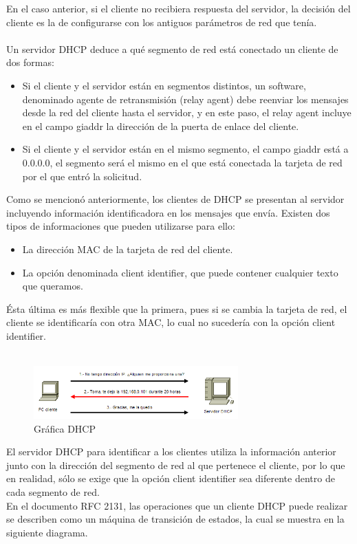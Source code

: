 		En el caso anterior, si el cliente no recibiera respuesta del servidor, la decisión del cliente es la de configurarse con los antiguos parámetros de red que tenía.\\\\
		Un servidor DHCP deduce a qué segmento de red está conectado un cliente de dos formas:
			\begin{itemize}
				\item Si el cliente y el servidor están en segmentos distintos, un software, denominado agente de retransmisión (relay agent) debe reenviar los mensajes desde la red del cliente hasta el servidor, y en este paso, el relay agent incluye en el campo giaddr la dirección de la puerta de enlace del cliente.
				\item Si el cliente y el servidor están en el mismo segmento, el campo giaddr está a 0.0.0.0, el segmento será el mismo en el que está conectada la tarjeta de red por el que entró la solicitud.
			\end{itemize}
Como se mencionó anteriormente, los clientes de DHCP se presentan al servidor incluyendo información identificadora en los mensajes que envía. Existen dos tipos de informaciones que pueden utilizarse para ello:
	\begin{itemize}
		\item La dirección MAC de la tarjeta de red del cliente.
		\item La opción denominada client identifier, que puede contener cualquier texto que queramos.
	\end{itemize}

Ésta última es más flexible que la primera, pues si se cambia la tarjeta de red, el cliente se identificaría con otra MAC, lo cual no sucedería con la opción client identifier.\\\\

\begin{figure}
 \centering
  \includegraphics[width=0.7\textwidth]{img/ejemplo}
  \caption{Gráfica DHCP}
  \label{fig:10}
\end{figure}


El servidor DHCP para identificar a los clientes utiliza la información anterior junto con la dirección del segmento de red al que pertenece el cliente, por lo que en realidad, sólo se exige que la opción client identifier sea diferente dentro de cada segmento de red.\\
En el documento RFC 2131, las operaciones que un cliente DHCP puede realizar se describen como un máquina de transición de estados, la cual se muestra en la siguiente diagrama.\\

